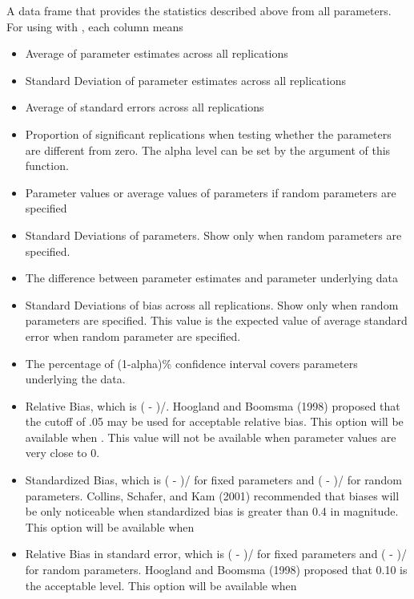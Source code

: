 \documentclass[a4paper]{book}
\begin{document}
\begin{Value}
A data frame that provides the statistics described above from all parameters.
For using with , each column means
\begin{itemize}

\item {} Average of parameter estimates across all replications
\item {} Standard Deviation of parameter estimates across all replications
\item {} Average of standard errors across all replications
\item {} Proportion of significant replications when testing whether the parameters are different from zero. The alpha level can be set by the  argument of this function.
\item {} Parameter values or average values of parameters if random parameters are specified
\item {} Standard Deviations of parameters. Show only when random parameters are specified.
\item {} The difference between parameter estimates and parameter underlying data
\item {} Standard Deviations of bias across all replications. Show only when random parameters are specified. 
This value is the expected value of average standard error when random parameter are specified.
\item {} The percentage of (1-alpha)\% confidence interval covers parameters underlying the data.
\item {} Relative Bias, which is ( - )/. 
Hoogland and Boomsma (1998) proposed that the cutoff of .05 may be used for acceptable relative bias.
This option will be available when . This value will not be available when parameter values are very close to 0.
\item {} Standardized Bias, which is ( - )/ 
for fixed parameters and ( - )/ 
for random parameters. Collins, Schafer, and Kam (2001) recommended that biases will be 
only noticeable when standardized bias is greater than 0.4 in magnitude.
This option will be available when 
\item {} Relative Bias in standard error, which is ( - )/ 
for fixed parameters and ( - )/ 
for random parameters. 	Hoogland and Boomsma (1998) proposed that 0.10 is the acceptable level.
This option will be available when 

\end{itemize}

\end{Value}
\end{document}
